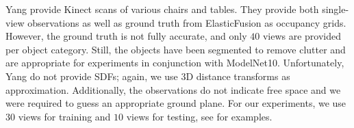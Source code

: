 

\boldparagraph{\Kinect}
%
Yang \etal provide Kinect scans of various chairs and tables. They provide both single-view observations as well as ground truth from ElasticFusion \citep{Whelan2015RSS} as occupancy grids. However, the ground truth is not fully accurate, and only $40$ views are provided per object category. Still, the objects have been segmented to remove clutter and are appropriate for experiments in conjunction with ModelNet10. Unfortunately, Yang \etal do not provide SDFs; again, we use 3D distance transforms as approximation. Additionally, the observations do not indicate free space and we were required to guess an appropriate ground plane. For our experiments, we use $30$ views for training and $10$ views for testing, see  for examples.